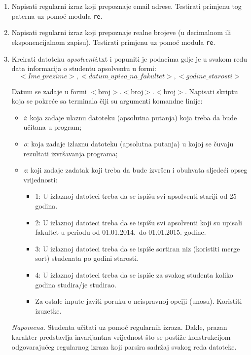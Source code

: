 \begin{enumerate}
	\item Napisati regularni izraz koji prepoznaje email adrese. Testirati primjenu tog paterna uz pomoć modula \texttt{re}.
	
	\item Napisati regularni izraz koji prepoznaje realne brojeve (u decimalnom ili eksponencijalnom zapisu). Testirati primjenu uz pomoć modula \texttt{re}.
	
	
	\item Kreirati datoteku \textit{apsolventi}.txt i popuniti je podacima gdje je u svakom redu data
	informacija o studentu apsolventu u formi: 
	 $$<Ime\_prezime>, <datum\_upisa\_na\_fakultet>, <godine\_starosti>$$ 
	
	Datum se zadaje u formi $<$broj$>$.$<$broj$>$.$<$broj$>$. Napisati skriptu koja se pokreće sa terminala čiji su argumenti komandne linije:
	\begin{itemize}
		\item  	\textit{i}: koja zadaje ulaznu datoteku (apsolutna putanja) koja treba da bude učitana u
	program;
	     \item \textit{o}: koja zadaje izlaznu datoteku (apsolutna putanja) u kojoj se čuvaju rezultati	izvršavanja programa;
	     \item  \textit{z}: koji zadaje zadatak koji treba da bude izvršen i obuhvata sljedeći opseg vrijednosti: 
	     \begin{itemize}
	     	\item  1: U izlaznoj datoteci treba da se ispišu svi apsolventi stariji od 25 godina.
             \item 2: U izlaznoj datoteci treba da se ispišu svi apsolventi koji su upisali fakultet u periodu od 01.01.2014.\ do 01.01.2015. godine.
	         \item 3: U izlaznoj datoteci treba da se ispiše sortiran niz (koristiti merge sort) studenata po godini starosti.
	         \item 4: U izlaznoj datoteci treba da se ispiše za svakog studenta koliko godina studira/je studirao.
	        \item Za ostale inpute javiti poruku o neispravnoj opciji (unosu). Koristiti izuzetke.
	         \end{itemize}
       \end{itemize}
	\textit{Napomena}. Studenta učitati uz pomoć regularnih izraza. Dakle, prazan karakter predstavlja 
	invarijantna vrijednost što se postiže konstru\-kcijom odgovarajućeg regularnog izraza koji parsira  sadržaj svakog reda  datoteke.
	

\end{enumerate}
